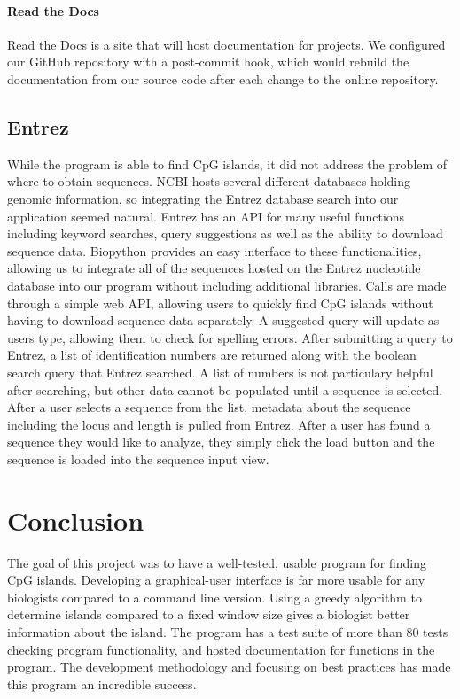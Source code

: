 \documentclass{bioinfo}
\begin{document}
\paragraph{Read the Docs\textcolon} 
Read the Docs is a site that will host documentation for projects. We configured our GitHub repository with a post-commit hook, which would rebuild the documentation from our source code after each change to the online repository.
      
\subsection{Entrez}

While the program is able to find CpG islands, it did not address the problem of where to obtain sequences. NCBI hosts several different databases holding genomic information, so integrating the Entrez database search into our application seemed natural. Entrez has an API for many useful functions including keyword searches, query suggestions as well as the ability to download sequence data. Biopython provides an easy interface to these functionalities, allowing us to integrate all of the sequences hosted on the Entrez nucleotide database into our program without including additional libraries. Calls are made through a simple web API, allowing users to quickly find CpG islands without having to download sequence data separately. A suggested query will update as users type, allowing them to check for spelling errors. After submitting a query to Entrez, a list of identification numbers are returned along with the boolean search query that Entrez searched. A list of numbers is not particulary helpful after searching, but other data cannot be populated until a sequence is selected. After a user selects a sequence from the list, metadata about the sequence including the locus and length is pulled from Entrez. After a user has found a sequence they would like to analyze, they simply click the load button and the sequence is loaded into the sequence input view.

\section{Conclusion}
The goal of this project was to have a well-tested, usable program for finding CpG islands. Developing a graphical-user interface is far more usable for any biologists compared to a command line version. Using a greedy algorithm to determine islands compared to a fixed window size gives a biologist better information about the island. The program has a test suite of more than 80 tests checking program functionality, and hosted documentation for functions in the program. The development methodology and focusing on best practices has made this program an incredible success.

% 
% 

% 
% 
% 
% 
% 

\end{document}
